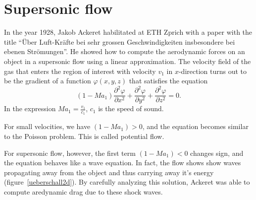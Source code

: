 %
%
%
\section{Supersonic flow}
In the year 1928, Jakob Ackeret habilitated at ETH Zprich with a 
paper with the title
``Über Luft-Kräfte bei sehr grossen
Geschwindigkeiten insbesondere bei ebenen Strömungen''.
He showed how to compute the aerodynamic forces on an object
in a supersonic flow using a linear approximation.
The velocity field of the gas that enters the region of interest with
velocity $v_1$ in $x$-direction turns out to be the gradient of
a function $\varphi(x,y,z)$ that satisfies the equation
\[
(1-Ma_1)\frac{\partial^2\varphi}{\partial x^2}
+
\frac{\partial^2\varphi}{\partial y^2}
+
\frac{\partial^2\varphi}{\partial z^2}=0.
\]
In the expression
$Ma_1=\frac{v_1}{c_1}$, $c_1$ is the speed of sound.

For small velocities, we have $(1-Ma_1)>0$, and the equation
becomes similar to the Poisson problem.
This is called potential flow.

For supersonic flow, however, the first term
$(1-Ma_1) < 0$
changes sign, and the equation behaves like a wave equation.
In fact, the flow shows show waves propagating away from the object
and thus carrying away it's energy
(figure~\ref{ueberschall2d}).
By carefully analyzing this solution, Ackeret was able to compute
aredynamic drag due to these shock waves.

